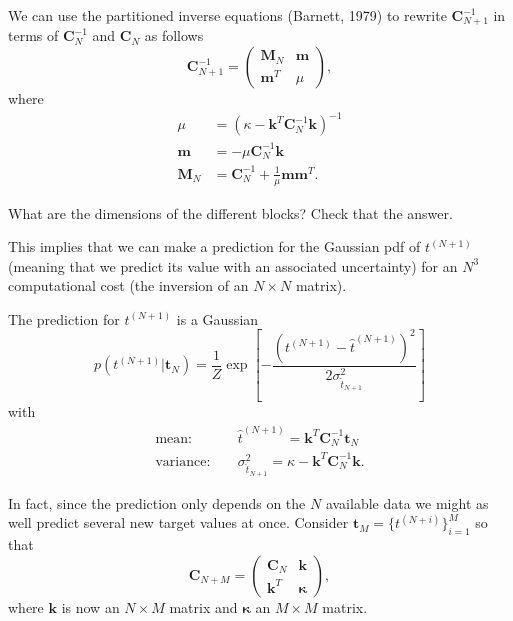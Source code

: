 \documentclass[%
oneside,                 %
final,                   %
10pt]{article}
\newenvironment{summary_mdfboxadmon}[1][]{
\begin{summary_mdfboxmdframed}[frametitle=#1]
}
{
\end{summary_mdfboxmdframed}
}
\newenvironment{question_mdfboxadmon}[1][]{
\begin{question_mdfboxmdframed}[frametitle=#1]
}
{
\end{question_mdfboxmdframed}
}
\begin{document}
We can use the partitioned inverse equations (Barnett, 1979) to rewrite $\boldsymbol{C}_{N+1}^{-1}$ in terms of $\boldsymbol{C}_{N}^{-1}$ and $\boldsymbol{C}_{N}$ as follows
\[
\boldsymbol{C}_{N+1}^{-1} =
\begin{pmatrix}
\boldsymbol{M}_N & \boldsymbol{m} \\
\boldsymbol{m}^T & \mu
\end{pmatrix},
\]
where
\begin{align*}
\mu &= \left( \kappa - \boldsymbol{k}^T \boldsymbol{C}_N^{-1} \boldsymbol{k} \right)^{-1} \\
\boldsymbol{m} &= -\mu \boldsymbol{C}_N^{-1} \boldsymbol{k} \\
\boldsymbol{M}_N &= \boldsymbol{C}_N^{-1} + \frac{1}{\mu} \boldsymbol{m} \boldsymbol{m}^T.
\end{align*}


\begin{question_mdfboxadmon}[Question]
What are the dimensions of the different blocks? Check that the answer.
\end{question_mdfboxadmon} %



This implies that we can make a prediction for the Gaussian pdf of $t^{(N+1)}$ (meaning that we predict its value with an associated uncertainty) for an $N^3$ computational cost (the inversion of an $N \times N$ matrix).


\begin{summary_mdfboxadmon}[Summary]
The prediction for $t^{(N+1)}$ is a Gaussian
\[
p \left( t^{(N+1)} | \boldsymbol{t}_N \right) = \frac{1}{Z} \exp
\left[
-\frac{\left( t^{(N+1)} - \hat{t}^{(N+1)} \right)^2}{2 \sigma_{\hat{t}_{N+1}}^2}
\right]
\]
with
\begin{align*}
\mathrm{mean:} & \quad \hat{t}^{(N+1)} = \boldsymbol{k}^T \boldsymbol{C}_N^{-1} \boldsymbol{t}_N \\
\mathrm{variance:} & \quad \sigma_{\hat{t}_{N+1}}^2 = \kappa - \boldsymbol{k}^T \boldsymbol{C}_N^{-1} \boldsymbol{k}.
\end{align*}
\end{summary_mdfboxadmon} %



In fact, since the prediction only depends on the $N$ available data we might as well predict several new target values at once. Consider $\boldsymbol{t}_M = \{ t^{(N+i)} \}_{i=1}^M$ so that
\[
\boldsymbol{C}_{N+M} =
\begin{pmatrix}
\boldsymbol{C}_N & \boldsymbol{k} \\
\boldsymbol{k}^T & \boldsymbol{\kappa}
\end{pmatrix},
\]
where $\boldsymbol{k}$ is now an $N \times M$ matrix and $\boldsymbol{\kappa}$ an $M \times M$ matrix.
\end{document}

